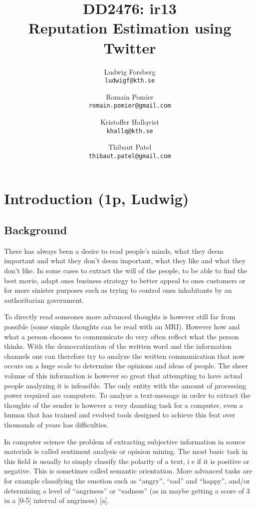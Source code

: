 \documentclass[a4paper,12pt]{report}
\title{\TitleFontTwo DD2476: ir13 \\ \TitleFont Reputation Estimation using Twitter}
\author{Ludwig Forsberg \\ \texttt{ludwigf@kth.se} \and Romain Pomier \\ \texttt{romain.pomier@gmail.com} \and Kristoffer Hallqvist \\ \texttt{khallq@kth.se} \and Thibaut Patel \\ \texttt{thibaut.patel@gmail.com}}
\begin{document}
\maketitle
\clearpage


\tableofcontents

\clearpage
\chapter{Introduction (1p, Ludwig)}
\vspace{-0cm}

\section{Background}

There has always been a desire to read people's minds, what they deem important and what they don't deem important, what they like and what they don't like. 
In some cases to extract the will of the people, to be able to find the best movie, adapt ones business strategy to better appeal to ones customers or for more sinister purposes such as trying to control ones inhabitants by an authoritarian government.

To directly read someones more advanced thoughts is however still far from possible (some simple thoughts can be read with an MRI). 
However how and what a person chooses to communicate do very often reflect what the person thinks. With the democratization of the written word and the information channels one can therefore try to analyze the written communication that now occurs on a huge scale to determine the opinions and ideas of people. 
The sheer volume of this information is however so great that attempting to have actual people analyzing it is infeasible. 
The only entity with the amount of processing power required are computers. 
To analyze a text-message in order to extract the thoughts of the sender is however a very daunting task for a computer, even a human that has trained and evolved tools designed to achieve this feat over thousands of years has difficulties.

In computer science the problem of extracting subjective information in source materials is called sentiment analysis or opinion mining. 
The most basic task in this field is usually to simply classify the polarity of a text, i e if it is positive or negative. 
This is sometimes called semantic orientation. 
More advanced tasks are for example classifying the emotion such as “angry”, “sad” and “happy”, and/or determining a level of “angriness” or “sadness” (as in maybe getting a score of 3 in a [0-5] interval of angriness) [a].
\end{document}
